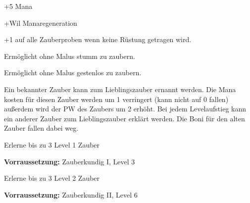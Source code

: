 \documentclass[../../Heldenanleitung2]{subfiles}
\begin{document}
\begin{multicols}{2}

\begin{tcolorbox}[title={Magisches Reservoir},colbacktitle=blue, coltitle=white]    
   +5 Mana
\end{tcolorbox}

\begin{tcolorbox}[title={Schnelle magische Erholung},colbacktitle=blue, coltitle=white]    
   +Wil Manaregeneration
\end{tcolorbox}

\begin{tcolorbox}[title={leichte Magie},colbacktitle=blue, coltitle=white]    
   +1 auf alle Zauberproben wenn keine Rüstung getragen wird.
\end{tcolorbox}

\begin{tcolorbox}[title={Stummes Zaubern},colbacktitle=blue, coltitle=white]    
   Ermöglicht ohne Malus stumm zu zaubern.
\end{tcolorbox}

\begin{tcolorbox}[title={Gestenloses Zaubern},colbacktitle=blue, coltitle=white]    
   Ermöglicht ohne Malus gestenlos zu zaubern.
\end{tcolorbox}

\begin{tcolorbox}[title={Lieblingszauber},colbacktitle=blue, coltitle=white]    
   Ein bekannter Zauber kann zum Lieblingszauber ernannt werden. Die Mana kosten für diesen Zauber werden um 1 verringert (kann nicht auf 0 fallen) außerdem wird der PW des Zaubers um 2 erhöht. Bei jedem Levelaufstieg kann ein anderer Zauber zum Lieblingszauber erklärt werden. Die Boni für den alten Zauber fallen dabei weg.
\end{tcolorbox}

\begin{tcolorbox}[title={Zauberkundig I},colbacktitle=blue, coltitle=white]    
   Erlerne bis zu 3 Level 1 Zauber
\end{tcolorbox}

\begin{tcolorbox}[title={Zauberkundig II},colbacktitle=blue, coltitle=white]
	\textbf{Vorraussetzung:} Zauberkundig I, Level 3
	\vspace{0.2cm}
	
   Erlerne bis zu 3 Level 2 Zauber
\end{tcolorbox}

\begin{tcolorbox}[title={Zauberkundig III},colbacktitle=blue, coltitle=white]
	\textbf{Vorraussetzung:} Zauberkundig II, Level 6
	\vspace{0.2cm}
	

\end{tcolorbox}
\end{multicols}
\end{document}
